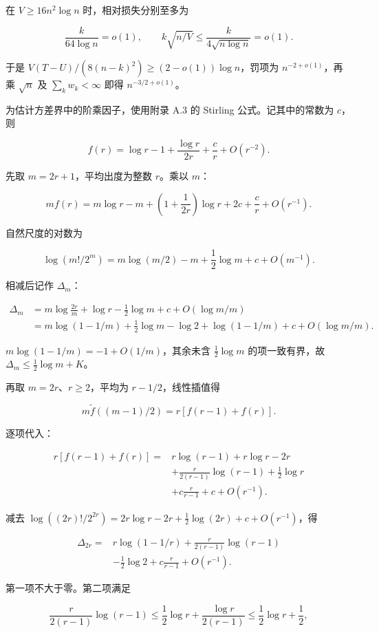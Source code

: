 \documentclass[11pt,a4paper]{article}
\begin{document}
在 \(V\ge16n^2\log n\) 时，相对损失分别至多为

\[\frac{k}{64\log n}=o(1),\qquad
k\sqrt{n/V}\le\frac{k}{4\sqrt{n\log n}}=o(1).\]

于是 \(V(T-U)/(8(n-k)^2)\ge(2-o(1))\log n\)，罚项为 \(n^{-2+o(1)}\)，再乘 \(\sqrt n\) 及 \(\sum_kw_k<\infty\) 即得 \(n^{-3/2+o(1)}\)。

为估计方差界中的阶乘因子，使用附录 A.3 的 Stirling 公式。记其中的常数为 \(c\)，则

\[f(r)=\log r-1+\frac{\log r}{2r}+\frac cr+O(r^{-2}).\]

先取 \(m=2r+1\)，平均出度为整数 \(r\)。乘以 \(m\)：

\[mf(r)=m\log r-m+\left(1+\frac1{2r}\right)\log r
+2c+\frac cr+O(r^{-1}).\]

自然尺度的对数为

\[\log(m!/2^m)=m\log(m/2)-m+\frac12\log m+c+O(m^{-1}).\]

相减后记作 \(\Delta_m\)：

\[\begin{aligned}
\Delta_m
&=m\log\frac{2r}{m}+\log r-\frac12\log m
+c+O(\log m/m)\\
&=m\log(1-1/m)+\frac12\log m-\log2
+\log(1-1/m)+c+O(\log m/m).
\end{aligned}\]

\(m\log(1-1/m)=-1+O(1/m)\)，其余未含 \(\frac12\log m\) 的项一致有界，故 \(\Delta_m\le\frac12\log m+K\)。

再取 \(m=2r\)、\(r\ge2\)，平均为 \(r-1/2\)，线性插值得

\[m\widetilde f((m-1)/2)=r[f(r-1)+f(r)].\]

逐项代入：

\[\begin{aligned}
r[f(r-1)+f(r)]
={}&r\log(r-1)+r\log r-2r\\
&+\frac r{2(r-1)}\log(r-1)+\frac12\log r\\
&+c\frac r{r-1}+c+O(r^{-1}).
\end{aligned}\]

减去 \(\log((2r)!/2^{2r})=2r\log r-2r+\frac12\log(2r)+c+O(r^{-1})\)，得

\[\begin{aligned}
\Delta_{2r}
={}&r\log(1-1/r)
+\frac r{2(r-1)}\log(r-1)\\
&-\frac12\log2+c\frac r{r-1}+O(r^{-1}).
\end{aligned}\]

第一项不大于零。第二项满足

\[\frac r{2(r-1)}\log(r-1)
\le\frac12\log r+\frac{\log r}{2(r-1)}
\le\frac12\log r+\frac12,\]
\end{document}
